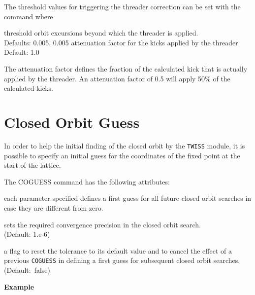 The threshold values for triggering the threader correction can be set
with the command  
where 
\begin{madlist}
   threshold orbit excursions beyond which the threader
  is applied. \\ Defaults: 0.005, 0.005
   attenuation factor for the kicks applied by the threader
  \\ Default: 1.0 
\end{madlist}

The attenuation factor defines the fraction of the calculated kick that
is actually applied by the threader.  
An attenuation factor of 0.5 will apply 50\% of the calculated kicks.

\section{Closed Orbit Guess}
\label{subsec:coguess}

In order to help the initial finding of the closed orbit by the
\texttt{TWISS} module, it is possible to specify an initial guess for
the coordinates of the fixed point at the start of the lattice.


The COGUESS command has the following attributes:
\begin{madlist}
   each parameter specified defines a first guess for all future closed orbit
  searches in case they are different from zero.  
  
   sets the required convergence precision in the closed
  orbit search. \\ (Default: 1.e-6)  
  
   a flag to reset the tolerance to its default value and to
  cancel the effect of a previous \texttt{COGUESS} in defining a first
  guess for subsequent closed orbit searches. \\ (Default:~false) 

\end{madlist}


\textbf{Example}\\



